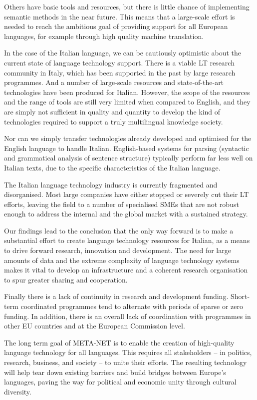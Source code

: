 \begin{multicols}{2}
Others have basic tools and resources, but there is little chance of implementing semantic methods in the near future. This means that a large-scale effort is needed to reach the ambitious goal of providing support for all European languages, for example through high quality machine translation.

In the case of the Italian language, we can be cautiously optimistic about the current state of language technology support. There is a viable LT research community in Italy, which has been supported in the past by large research programmes. And a number of large-scale resources and state-of-the-art technologies have been produced for Italian. However, the scope of the resources and the range of tools are still very limited when compared to English, and they are simply not sufficient in quality and quantity to develop the kind of technologies required to support a truly multilingual knowledge society.

Nor can we simply transfer technologies already developed and optimised for the English language to handle Italian. English-based systems for parsing (syntactic and grammatical analysis of sentence structure) typically perform far less well on Italian texts, due to the specific characteristics of the Italian language.

The Italian language technology industry is currently fragmented and disorganised. Most large companies have either stopped or severely cut their LT efforts, leaving the field to a number of specialised SMEs that are not robust enough to address the internal and the global market with a sustained strategy. 

Our findings lead to the conclusion that the only way forward is to make a substantial effort to create language technology resources for Italian, as a means to drive forward research, innovation and development. The need for large amounts of data and the extreme complexity of language technology systems makes it vital to develop an infrastructure and a coherent research organisation to spur greater sharing and cooperation.

Finally there is a lack of continuity in research and development funding. Short-term coordinated programmes tend to alternate with periods of sparse or zero funding. In addition, there is an overall lack of coordination with programmes in other EU countries and at the European Commission level.

The long term goal of META-NET is to enable the creation of high-quality language technology for all languages. This requires all stakeholders -- in politics, research, business, and society -- to unite their efforts. The resulting technology will help tear down existing barriers and build bridges between Europe's languages, paving the way for political and economic unity through cultural diversity. 

\end{multicols}

